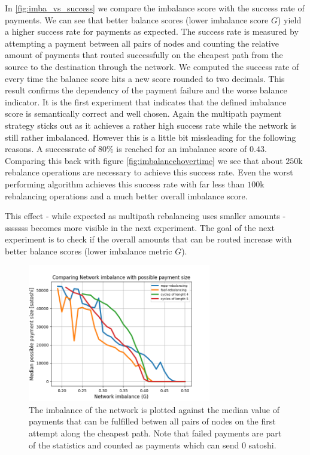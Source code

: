 \documentclass[a4paper]{paper}
\begin{document}
In \cref{fig:imba_vs_success} we compare the imbalance score with the success rate of payments.
We can see that better balance scores (lower imbalance score $G$) yield a higher success rate for payments as expected.
The success rate is measured by attempting a payment between all pairs of nodes and counting the relative amount of payments that routed successfully on the cheapest path from the source to the destination through the network.
We computed the success rate of every time the balance score hits a new score rounded to two decimals.
This result confirms the dependency of the payment failure and the worse balance indicator. It is the first experiment that indicates that the defined imbalance score is semantically correct and well chosen. 
Again the multipath payment strategy sticks out as it achieves a rather high success rate while the network is still rather imbalanced.
However this is a little bit missleading for the following reasons.
A successrate of $80\%$ is reached for an imbalance score of $0.43$.
Comparing this back with figure \cref{fig:imbalancehovertime} we see that about $250$k rebalance operations are necessary to achieve this success rate.
Even the worst performing algorithm achieves this success rate with far less than $100$k rebalancing operations and a much better overall imbalance score. 

This effect - while expected as multipath rebalancing uses smaller amounts -sssssss becomes more visible in the next experiment. 
The goal of the next experiment is to check if the overall amounts that can be routed increase with better balance scores (lower imbalance metric $G$).

\begin{figure}
 \centering
 \includegraphics[width=8cm]{code/vs/fig/imba_vs_median_payment_size.png}
 \caption{The imbalance of the network is plotted against the median value of payments that can be fulfilled betwen all pairs of nodes on the first attempt along the cheapest path. Note that failed payments are part of the statistics and counted as payments which can send $0$ satoshi.}
 \label{fig:imba_vs_payment_size}
\end{figure}
\end{document}
